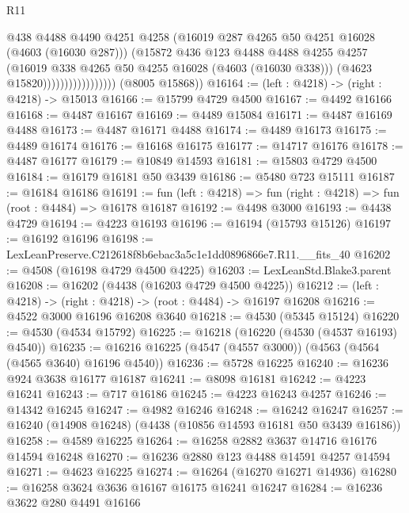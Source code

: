 \begin{lexlean}{R11}
\begin{coremodule}
                                    @438
                                    @4488
                                    @4490
                                    @4251
                                    @4258
                                    (@16019 @287 @4265 @50 @4251 @16028 (@4603 (@16030 @287)))
                                    (@15872
                                      @436
                                      @123
                                      @4488
                                      @4488
                                      @4255
                                      @4257
                                      (@16019 @338 @4265 @50 @4255 @16028 (@4603 (@16030 @338)))
                                      (@4623 @15820)))))))))))))))))
      (@8005 @15868))
@16164 := (left : @4218) -> (right : @4218) -> @15013
@16166 := @15799 @4729 @4500
@16167 := @4492 @16166
@16168 := @4487 @16167
@16169 := @4489 @15084
@16171 := @4487 @16169 @4488
@16173 := @4487 @16171 @4488
@16174 := @4489 @16173
@16175 := @4489 @16174
@16176 := @16168 @16175
@16177 := @14717 @16176
@16178 := @4487 @16177
@16179 := @10849 @14593
@16181 := @15803 @4729 @4500
@16184 := @16179 @16181 @50 @3439
@16186 := @5480 @723 @15111
@16187 := @16184 @16186
@16191 := fun (left : @4218) => fun (right : @4218) => fun (root : @4484) => @16178 @16187
@16192 := @4498 @3000
@16193 := @4438 @4729
@16194 := @4223 @16193
@16196 := @16194 (@15793 @15126)
@16197 := @16192 @16196
@16198 := LexLeanPreserve.C212618f8b6ebac3a5c1e1dd0896866e7.R11.__fits_40
@16202 := @4508 (@16198 @4729 @4500 @4225)
@16203 := LexLeanStd.Blake3.parent
@16208 := @16202 (@4438 (@16203 @4729 @4500 @4225))
@16212 := (left : @4218) -> (right : @4218) -> (root : @4484) -> @16197 @16208
@16216 := @4522 @3000 @16196 @16208 @3640
@16218 := @4530 (@5345 @15124)
@16220 := @4530 (@4534 @15792)
@16225 := @16218 (@16220 (@4530 (@4537 @16193) @4540))
@16235 := @16216 @16225 (@4547 (@4557 @3000)) (@4563 (@4564 (@4565 @3640) @16196 @4540))
@16236 := @5728 @16225
@16240 := @16236 @924 @3638 @16177 @16187
@16241 := @8098 @16181
@16242 := @4223 @16241
@16243 := @717 @16186
@16245 := @4223 @16243 @4257
@16246 := @14342 @16245
@16247 := @4982 @16246
@16248 := @16242 @16247
@16257 := @16240 (@14908 @16248) (@4438 (@10856 @14593 @16181 @50 @3439 @16186))
@16258 := @4589 @16225
@16264 := @16258 @2882 @3637 @14716 @16176 @14594 @16248
@16270 := @16236 @2880 @123 @4488 @14591 @4257 @14594
@16271 := @4623 @16225
@16274 := @16264 (@16270 @16271 @14936)
@16280 := @16258 @3624 @3636 @16167 @16175 @16241 @16247
@16284 := @16236 @3622 @280 @4491 @16166

\end{coremodule}
\end{lexlean}
